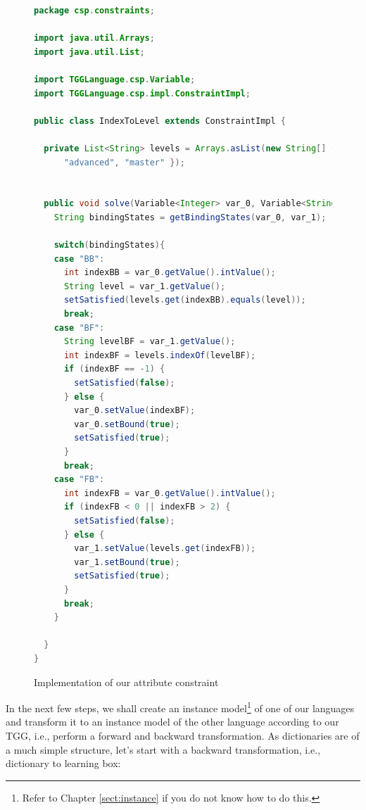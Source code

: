 \begin{figure}[htbp]
\begin{center}
\begin{lstlisting}[language=Java,backgroundcolor=\color{white}, keywordstyle={\bfseries\color{purple}}]
package csp.constraints;

import java.util.Arrays;
import java.util.List;

import TGGLanguage.csp.Variable;
import TGGLanguage.csp.impl.ConstraintImpl;

public class IndexToLevel extends ConstraintImpl {

  private List<String> levels = Arrays.asList(new String[] { "beginner",
      "advanced", "master" });


  public void solve(Variable<Integer> var_0, Variable<String> var_1){
    String bindingStates = getBindingStates(var_0, var_1);

    switch(bindingStates){
    case "BB":
      int indexBB = var_0.getValue().intValue();
      String level = var_1.getValue();
      setSatisfied(levels.get(indexBB).equals(level));
      break;
    case "BF":
      String levelBF = var_1.getValue();
      int indexBF = levels.indexOf(levelBF);
      if (indexBF == -1) {
        setSatisfied(false);
      } else {
        var_0.setValue(indexBF);
        var_0.setBound(true);
        setSatisfied(true);
      }
      break;
    case "FB":
      int indexFB = var_0.getValue().intValue();
      if (indexFB < 0 || indexFB > 2) {
        setSatisfied(false);
      } else {
        var_1.setValue(levels.get(indexFB));
        var_1.setBound(true);
        setSatisfied(true);
      }
      break;
    }

  }
}
\end{lstlisting}
  \caption{Implementation of our attribute constraint}
  \label{fig:indexToLevel}
\end{center}
\end{figure}

In the next few steps, we shall create an instance model\footnote{Refer to Chapter \ref{sect:instance} if you do not know how to do this.} of one of our languages and  transform it to an instance model of the other language according to our TGG, i.e., perform a forward and backward transformation.
As dictionaries are of a much simple structure, let's start with a backward transformation, i.e., dictionary to learning box:

